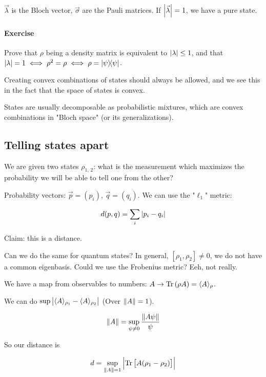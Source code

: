 \(\vec{\lambda}\) is the Bloch vector, \(\vec{\sigma}\) are the Pauli matrices.
If \(\abs{\vec{\lambda}} = 1\), we have a pure state.

\paragraph{Exercise}
Prove that \(\rho\) being a density matrix is equivalent to \(\abs{\lambda}\leq 1\), and that \(\abs{\lambda} = 1 \iff \rho^2 = \rho \iff \rho = \ketbra{\psi}\).

Creating convex combinations of states should always be allowed,  and we see this in the fact that the space of states is convex.

States are usually decomposable as probabilistic mixtures, which are convex combinations in "Bloch space" (or its generalizations).

\subsection{Telling states apart} We are given two states \(\rho _{1, \, 2}\): what is the measurement which maximizes the probability we will be able to tell one from the other?

Probability vectors: \(\vec{p} = (p_i)\), \(\vec{q} = (q_i)\). We can use the "\(\ell_1\)" metric:

\begin{equation}
  d(p, q) = \sum_i \abs{p_i - q_i}
\end{equation}

Claim: this is a distance.

Can we do the same for quantum states? In general, \([\rho_1,  \rho_2] \neq 0\), we do not have a common eigenbasis. Could we use the Frobenius metric? Eeh, not really.

We have a map from observables to numbers: \(A \rightarrow \Tr \qty(\rho A) = \langle A \rangle_\rho\).

We can do \(\sup{\abs{{\langle A \rangle_{\rho_1} - \langle A \rangle_{\rho_2}}}}\) (Over \(\norm{A} = 1\)).

\begin{equation}
  \norm{A} = \sup_{\psi \neq 0} \frac{\norm{A\psi}}{{\psi}}
\end{equation}

So our distance is

\begin{equation}
  d = \sup_{\norm{A}=1} \abs{\Tr \qty[A(\rho_1 - \rho_2)]}
\end{equation}

